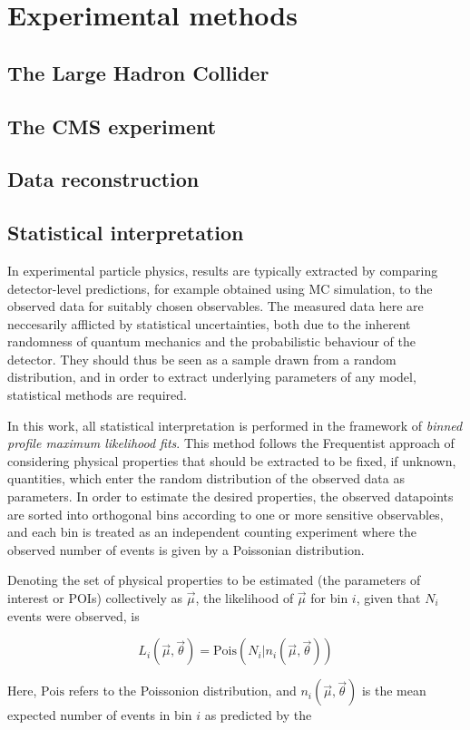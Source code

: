 \chapter{Experimental methods}
\label{ch:methods}

\section{The Large Hadron Collider}

\section{The CMS experiment}

\section{Data reconstruction}
\label{sec:methods:reco}

\section{Statistical interpretation}

In experimental particle physics, results are typically extracted by comparing detector-level predictions, for example obtained using MC simulation, to the observed data for suitably chosen observables. The measured data here are neccesarily afflicted by statistical uncertainties, both due to the inherent randomness of quantum mechanics and the probabilistic behaviour of the detector. They should thus be seen as a sample drawn from a random distribution, and in order to extract underlying parameters of any model, statistical methods are required.

In this work, all statistical interpretation is performed in the framework of \textit{binned profile maximum likelihood fits}. This method follows the Frequentist approach of considering physical properties that should be extracted to be fixed, if unknown, quantities, which enter the random distribution of the observed data as parameters. In order to estimate the desired properties, the observed datapoints are sorted into orthogonal bins according to one or more sensitive observables, and each bin is treated as an independent counting experiment where the observed number of events is given by a Poissonian distribution. 

Denoting the set of physical properties to be estimated (the parameters of interest or POIs) collectively as $\vec{\mu}$, the likelihood of $\vec{\mu}$ for bin $i$, given that $N_i$ events were observed, is

\begin{equation}
    L_i (\vec{\mu}, \vec{\theta}) = \mathrm{Pois} \left(N_i | n_i (\vec{\mu}, \vec{\theta}) \right)
\end{equation}

Here, $\mathrm{Pois}$ refers to the Poissonion distribution, and $n_i (\vec{\mu}, \vec{\theta})$ is the mean expected number of events in bin $i$ as predicted by the 